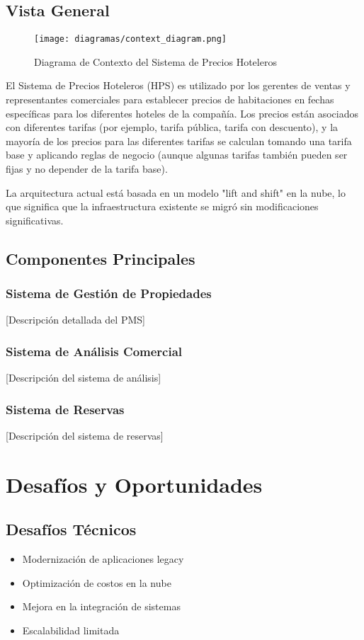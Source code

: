 \documentclass[12pt,a4paper]{article}
\begin{document}
\subsection{Vista General}
\begin{figure}[H]
    \centering
    \texttt{[image: diagramas/context\_diagram.png]}
    \caption{Diagrama de Contexto del Sistema de Precios Hoteleros}
    \label{fig:context-diagram}
\end{figure}

El Sistema de Precios Hoteleros (HPS) es utilizado por los gerentes de ventas y representantes comerciales para establecer precios de habitaciones en fechas específicas para los diferentes hoteles de la compañía. Los precios están asociados con diferentes tarifas (por ejemplo, tarifa pública, tarifa con descuento), y la mayoría de los precios para las diferentes tarifas se calculan tomando una tarifa base y aplicando reglas de negocio (aunque algunas tarifas también pueden ser fijas y no depender de la tarifa base).

La arquitectura actual está basada en un modelo "lift and shift" en la nube, lo que significa que la infraestructura existente se migró sin modificaciones significativas.

\subsection{Componentes Principales}
\subsubsection{Sistema de Gestión de Propiedades}
[Descripción detallada del PMS]

\subsubsection{Sistema de Análisis Comercial}
[Descripción del sistema de análisis]

\subsubsection{Sistema de Reservas}
[Descripción del sistema de reservas]

\section{Desafíos y Oportunidades}
\subsection{Desafíos Técnicos}
\begin{itemize}
    \item Modernización de aplicaciones legacy
    \item Optimización de costos en la nube
    \item Mejora en la integración de sistemas
    \item Escalabilidad limitada
\end{itemize}
\end{document}
